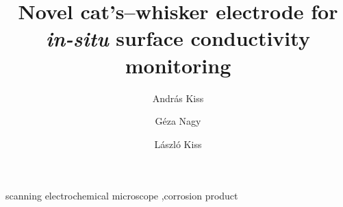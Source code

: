 \documentclass[3p]{elsarticle}
\begin{document}
\begin{frontmatter}

\title{Novel cat's--whisker electrode for \emph{in-situ} surface conductivity monitoring}
\author[akiss]{Andr\'{a}s Kiss}
\address[akiss, gnagy]{Department of General and Physical Chemistry, Faculty of Sciences, University of P\'{e}cs, 7624 P\'{e}cs, Ifj\'{u}s\'{a}g \'{u}tja 6, Hungary}
\address[akiss, gnagy]{J\'{a}nos Szent\'{a}gothai Research Centre, University of P\'{e}cs, 7624 P\'{e}cs, Ifj\'{u}s\'{a}g \'{u}tja 20, Hungary}
\author[gnagy]{G\'{e}za Nagy}
\author[lkiss]{L\'{a}szl\'{o} Kiss}

\begin{abstract}
\end{abstract}

\begin{keyword}
	scanning electrochemical microscope \sep corrosion product
\end{keyword}
\end{frontmatter}
\end{document}
